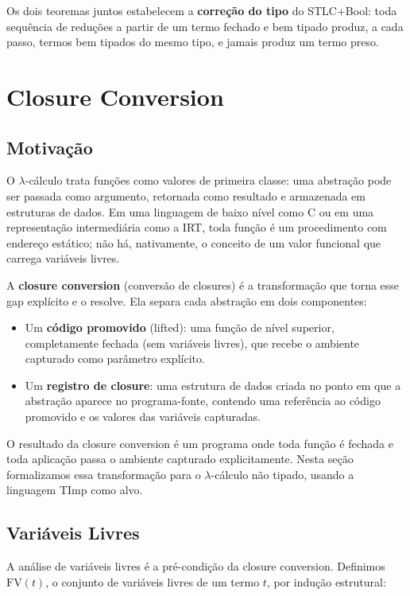 Os dois teoremas juntos estabelecem a \textbf{correção do tipo} do
STLC+Bool: toda sequência de reduções a partir de um termo fechado e
bem tipado produz, a cada passo, termos bem tipados do mesmo tipo, e
jamais produz um termo preso.

\section{Closure Conversion}

\subsection{Motivação}

O $\lambda$-cálculo trata funções como valores de primeira classe: uma
abstração pode ser passada como argumento, retornada como resultado e
armazenada em estruturas de dados. Em uma linguagem de baixo nível
como C ou em uma representação intermediária como a IRT, toda função
é um procedimento com endereço estático; não há, nativamente, o
conceito de um valor funcional que carrega variáveis livres.

A \textbf{closure conversion} (conversão de closures) é a
transformação que torna esse gap explícito e o resolve. Ela separa
cada abstração em dois componentes:

\begin{itemize}
  \item Um \textbf{código promovido} (lifted): uma função de nível superior,
    completamente fechada (sem variáveis livres), que recebe o ambiente
    capturado como parâmetro explícito.
  \item Um \textbf{registro de closure}: uma estrutura de dados criada no
    ponto em que a abstração aparece no programa-fonte, contendo uma
    referência ao código promovido e os valores das variáveis
    capturadas.
\end{itemize}

\noindent
O resultado da closure conversion é um programa onde toda função é
fechada e toda aplicação passa o ambiente capturado explicitamente.
Nesta seção formalizamos essa transformação para o $\lambda$-cálculo não
tipado, usando a linguagem TImp como alvo.

\subsection{Variáveis Livres}

A análise de variáveis livres é a pré-condição da closure conversion.
Definimos \(\mathrm{FV}(t)\), o conjunto de variáveis livres de um
termo \(t\), por indução estrutural:

